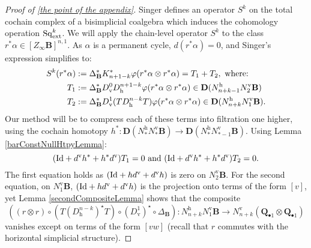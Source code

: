 \documentclass[11pt]{amsart} \renewcommand{\baselinestretch}{1.2}
\theoremstyle{plain}
\theoremstyle{definition}
\let\oldphi\phi
\let\phi\varphi
\renewcommand{\to}{\longrightarrow}
\newcommand{\DeltatubfD}{\Delta_{\mathrm{\textbf{B}}}}
\newcommand{\citeBOX}[2][]{\cite[\mbox{#1}]{#2}}
\newcommand{\Sq}{\mathrm{Sq}}
\newcommand{\EZ}[5]{[Z^{#1}_{#2}#3]^{#4}_{#5}}
\newcommand{\uver}{^\mathrm{v}}
\newcommand{\uhor}{^\mathrm{h}}
\newcommand{\dver}{_\mathrm{v}}
\newcommand{\dhor}{_\mathrm{h}}
\newcommand{\dual}{\mathbf{D}}
\begin{document}
\begin{appendices}
\begin{proof}[Proof of \ref{the point of the appendix}]
Singer \citeBOX[(2.14)]{MR2245560} defines  an operator $S^k$ on the total cochain complex of a bisimplicial coalgebra which induces the cohomology operation $\Sq^k_\textup{ext}$.
We will apply the chain-level operator $S^k$  to the class $r^*\alpha\in \EZ{}{\infty}{\textbf{B}}{n,1}{}$. As $\alpha$ is a permanent cycle, $d(r^*\alpha)=0$, and Singer's expression simplifies to:
\begin{alignat*}{2}
S^k(r^*\alpha):={}&\DeltatubfD^*K^*_{n+1-k}\oldphi(r^*\alpha\otimes r^*\alpha)=T_1+T_2,\textup{ where:}
\\
T_1
:={}&
\DeltatubfD^*D\dver^0D\dhor^{n+1-k}
\oldphi(r^*\alpha\otimes r^*\alpha)\in \dual(N\uhor_{n+k-1}N\uver_2\textbf{B})%
\\
T_2
:={}&
\DeltatubfD^*D\dver^1(TD\dhor^{n-k}T)
\oldphi(r^*\alpha\otimes r^*\alpha)\in \dual(N\uhor_{n+k}N\uver_1\textbf{B}).
\end{alignat*}
%
Our method will be to compress each of these terms into filtration one higher, using the cochain homotopy $h^*:\dual(N\uhor_* N\uver_*\textbf{B})\to \dual(N\uhor_*N\uver_{*-1}\textbf{B})$.
Using Lemma \ref{barConstNullHtpyLemma}:
\[(\textup{Id}+d\uver h^*+ h^*d\uver )T_1=0\textup{ and }(\textup{Id}+d\uver h^*+ h^*d\uver)T_2=0.\]
The first equation holds as $(\textup{Id}+hd\uver+d\uver h)$ is zero on $N\uver_2\textbf{B}$. For the second equation, on $N\uver_1\textbf{B}$,  $(\textup{Id}+hd\uver+d\uver h)$ is the projection onto terms of the form $[v]$, yet Lemma \ref{secondCompositeLemma} shows that the composite
\[((r\otimes r)\circ(T(D\dhor^{n-k})^\star T)\circ (D\dver^1)^\star\circ\DeltatubfD): N\uhor_{n+k}N\uver_1\textbf{B}\to N\uver_{n+k}(\textbf{Q}_{\bullet1}\otimes \textbf{Q}_{\bullet1})\]
vanishes except on terms of the form $[vw]$ (recall that $r$ commutes with the horizontal simplicial structure).


\end{proof}
\end{appendices}
\end{document}
